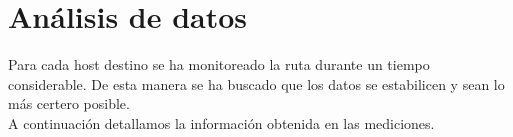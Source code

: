 \section{Análisis de datos}
Para cada host destino se ha monitoreado la ruta durante un tiempo considerable.
De esta manera se ha buscado que los datos se estabilicen y sean lo más certero posible.\\

A continuación detallamos la información obtenida en las mediciones.








